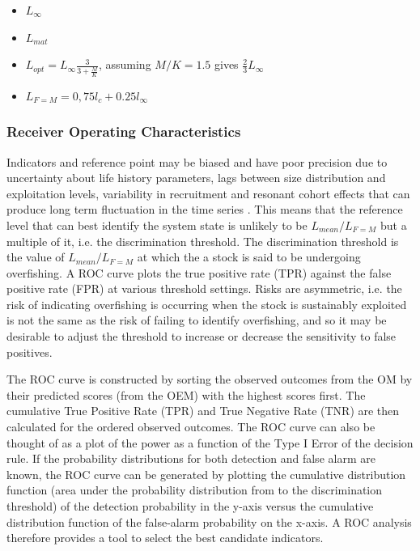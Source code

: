 \documentclass[12pt,doublespacing,a4paper]{ouparticle}
\begin{document}
\begin{itemize}
 \item $L_{\infty}$
 \item $L_{mat}$
 \item $L_{opt} = L_{\infty}\frac{3}{3+\frac{M}{K}}$, assuming $M/K = 1.5$ gives $\frac{2}{3}L_{\infty}$
 \item $L_{F=M} =  0,75l_c+0.25l_{\infty}$
\end{itemize}


\subsubsection{Receiver Operating Characteristics}

Indicators and reference point may be biased and have poor precision due to uncertainty about life history parameters, lags between size distribution and exploitation levels, variability in recruitment and resonant cohort effects that can produce long term fluctuation in the time series \citep{botsford2014cohort,bjoernstad2004trends}. This means that the reference level that can best identify the system state is unlikely to be $L_{mean}/L_{F=M}$ but a multiple of it, i.e. the discrimination threshold. The discrimination threshold is the value of $L_{mean}/L_{F=M}$ at which the a stock is said to be undergoing overfishing. A ROC curve plots the true positive rate (TPR) against the false positive rate  (FPR) at various threshold settings. Risks are asymmetric, i.e. the risk of indicating overfishing is occurring when the stock is sustainably exploited is not the same as the risk of failing to identify overfishing, and so it may be desirable to adjust the threshold to increase or decrease the sensitivity to false positives.

The ROC curve is constructed by sorting the observed outcomes from the OM by their predicted scores (from the OEM) with the highest scores first. The cumulative True Positive Rate (TPR) and True Negative Rate (TNR) are then calculated for the ordered observed outcomes. The ROC curve can also be thought of as a plot of the power as a function of the Type I Error of the decision rule. If the probability distributions for both detection and false alarm are known, the ROC curve can be generated by plotting the cumulative distribution function (area under the probability distribution from  to the discrimination threshold) of the detection probability in the y-axis versus the cumulative distribution function of the false-alarm probability on the x-axis. A ROC analysis therefore provides a tool to select the best candidate indicators. 
\end{document}
